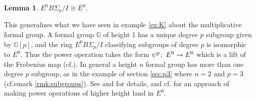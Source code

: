 \documentclass{gtpart}
\newtheorem{lem}[thm]{Lemma}
\theoremstyle{definition}
\theoremstyle{remark}
\def\co{\colon\thinspace}
\newcommand{\mb}[1]{\mathbb{#1}}
\newcommand{\cff}[2]{cf.\thinspace{\cite[#1]{#2}}}
\begin{document}
\begin{lem}
\label{lem:cong}
 $E^0 B\Sigma_p/I \cong E^0$.  
\end{lem}
This generalizes what we have seen in example \ref{ex:K} about the 
multiplicative formal group.  A formal group $\mb G$ of height 1 has a unique 
degree $p$ subgroup given by ${\mb G}[p]$, and the ring $E^0 B\Sigma_p/I$ 
classifying subgroups of degree $p$ is isomorphic to $E^0$.  Thus the power 
operation takes the form $\psi^p\co E^0 \to E^0$ which is a lift of the 
Frobenius map (\cff{section 4}{k1}).  In general a height $n$ formal group has 
more than one degree $p$ subgroup, as in the example of section \ref{sec:p3} 
where $n=2$ and $p=3$ (cf.emark \ref{rmk:subgroups}).  See 
\cite[theorem 42 and lemma 46]{strick} and \cite[section 1.4]{katzmazur} for 
details, and \cff{section 3.5}{Andu} for an approach of making power 
operations of higher height land in $E^0$.  
\end{document}
